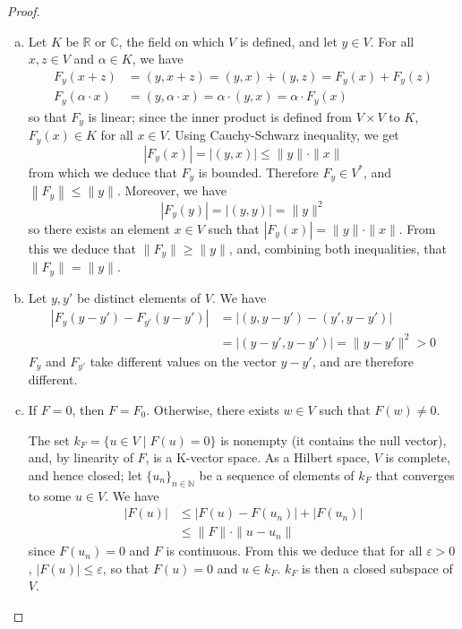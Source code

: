 \documentclass[11pt,a4paper,twoside]{article}
\theoremstyle{definition}
\begin{document}
\begin{proof}\hfill

  \begin{enumerate}[(a)]

  \item Let $K$ be $\mathbb{R}$ or $\mathbb{C}$, the field on which $V$ is defined, and let $y \in V$.
    For all $x, z \in V$ and $\alpha \in K$, we have
    \begin{align*}
      F_y ( x + z ) &= ( y, x + z ) = ( y, x ) + ( y, z ) = F_y ( x ) + F_y ( z ) \\
      F_y ( \alpha \cdot x ) &= ( y, \alpha \cdot x ) = \alpha \cdot ( y, x ) = \alpha \cdot F_y ( x )
    \end{align*}
    so that $F_y$ is linear; since the inner product is defined from $V \times V$ to $K$, $F_y ( x ) \in K$ for all $x \in V$.
    Using Cauchy-Schwarz inequality, we get
    \begin{equation*}
      \left| F_y ( x ) \right| = \left| \left( y, x \right) \right| \leq \| y \| \cdot \| x \|
    \end{equation*}
    from which we deduce that $F_y$ is bounded. Therefore $F_y \in V^*$, and $\left\| F_y \right\| \leq \| y \|$.
    Moreover, we have
    \begin{equation*}
      \left| F_y ( y ) \right| = | ( y, y ) | = \| y \|^2
    \end{equation*}
    so there exists an element $x \in V$ such that $| F_y ( x ) | = \| y \| \cdot \| x \|$. From this we deduce that
    $\| F_y \| \geq \| y \|$, and, combining both inequalities, that $\| F_y \| = \| y \|$.

  \item Let $y, y'$ be distinct elements of $V$. We have
    \begin{align*}
      | F_y ( y - y' ) - F_{y'} ( y - y' ) | &= | ( y, y - y' ) - ( y', y - y' ) | \\
      &= | ( y - y', y - y' ) | = \| y - y' \|^2 > 0
    \end{align*}
    $F_y$ and $F_{y'}$ take different values on the vector $y - y'$, and are therefore different.

  \item If $F = 0$, then $F = F_0$. Otherwise, there exists $w \in V$ such that $F ( w ) \neq 0$.

    The set $k_F = \{ u \in V \mid F ( u ) = 0 \}$ is nonempty (it contains the null vector), and, by linearity of $F$,
    is a K-vector space. As a Hilbert space, $V$ is complete, and hence closed; let $\{ u_n \}_{n \in \mathbb{N}}$ be
    a sequence of elements of $k_F$ that converges to some $u \in V$. We have
    \begin{align*}
      | F ( u ) | &\leq | F ( u ) - F ( u_n ) | + | F ( u_n ) | \\
      &\leq \| F \| \cdot \| u - u_n \|
    \end{align*}
    since $F ( u_n ) = 0$ and $F$ is continuous. From this we deduce that for all $\varepsilon > 0$,
    $| F ( u ) | \leq \varepsilon$, so that $F ( u ) = 0$ and $u \in k_F$. $k_F$ is then a closed subspace of $V$.


\end{enumerate}
\end{proof}
\end{document}
